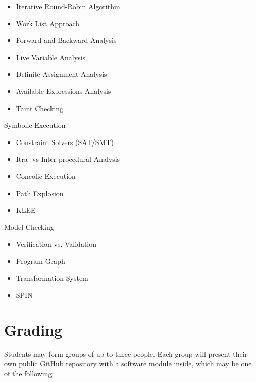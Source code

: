 \documentclass[nobrand,anonymous,nodate,nosecurity]{huawei}
\begin{document}
{\begin{lectures}
\begin{itemize}
	\item Iterative Round-Robin Algorithm
	\item Work List Approach
	\item Forward and Backward Analysis
	\item Live Variable Analysis
	\item Definite Assignment Analysis
	\item Available Expressions Analysis
	\item Taint Checking
	\end{itemize}
\item Symbolic Execution
	\begin{itemize}
	\item Constraint Solvers (SAT/SMT)
	\item Itra- vs Inter-procedural Analysis
	\item Concolic Execution
	\item Path Explosion
	\item KLEE
	\end{itemize}
\item Model Checking
	\begin{itemize}
	\item Verification vs. Validation
	\item Program Graph
	\item Transformation System
	\item SPIN
	\end{itemize}
\end{lectures}





\newpage
\section*{Grading}

Students may form groups of up to three people. Each group will present
their own public GitHub repository with a software module inside, which
may be one of the following:

}
\end{document}
